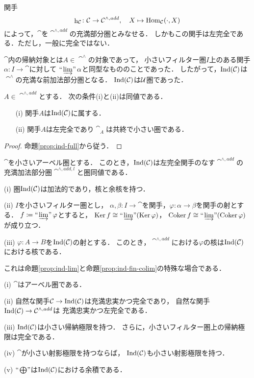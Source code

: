 関手
\begin{equation*}
    \mathop{\mathrm{h}}\nolimits_{\mathcal{C}}\colon\mathcal{C}\to\mathcal{C}^{\wedge,add},\quad X\mapsto\mathop{\mathrm{Hom}}\nolimits_{\mathcal{C}}(\cdot,X)
\end{equation*}
によって，$\cat$を$\cat^{\wedge,add}$の充満部分圏とみなせる．
しかもこの関手は左完全である．ただし，一般に完全ではない．

$\cat$内の帰納対象とは$A\in\cat^\wedge$の対象であって，
小さいフィルター圏$I$上のある関手$\alpha\colon I\to\cat$に対して
$\mathop{\text{``}\hspace{-0.7pt}\varinjlim\hspace{-1.5pt}\text{''}}\alpha$と同型なもののことであった．
したがって，$\mathop{\mathrm{Ind}}(\mathcal{C})$は$\cat^\wedge$の充満な前加法部分圏となる．
$\mathop{\mathrm{Ind}}(\mathcal{C})$は$\mathcal{U}$圏であった．

\begin{Proposition}
    $A\in\cat^{\wedge,add}$とする．
    次の条件(i)と(ii)は同値である．
    \begin{enumerate}
        \item [(i)]関手$A$は$\mathop{\mathrm{Ind}}(\mathcal{C})$に属する．
        \item [(ii)]関手$A$は左完全であり$\cat_A$は共終で小さい圏である．
    \end{enumerate}
\end{Proposition}
\begin{proof}
    命題\ref{prop:ind-full}から従う．
\end{proof}

\begin{Corollary}
    $\cat$を小さいアーベル圏とする．
    このとき，$\mathop{\mathrm{Ind}}(\mathcal{C})$は左完全関手のなす$\cat^{\wedge,add}$の
    充満加法部分圏$\cat^{\wedge,add,l}$と圏同値である．
\end{Corollary}

\begin{Lemma}\label{lem:ind-property}
    (i) 
    圏$\mathop{\mathrm{Ind}}(\mathcal{C})$は加法的であり，核と余核を持つ．

    (ii) 
    $I$を小さいフィルター圏とし，
    $\alpha, \beta\colon I\to\cat$を関手，$\varphi\colon\alpha\to\beta$を関手の射とする．
    $f\coloneqq\mathop{\text{``}\hspace{-0.7pt}\varinjlim\hspace{-1.5pt}\text{''}}\varphi$とすると，
    $\mathop{\mathrm{Ker}}\nolimits f\cong\mathop{\text{``}\hspace{-0.7pt}\varinjlim\hspace{-1.5pt}\text{''}}(\mathop{\mathrm{Ker}}\nolimits\varphi)$，
    $\mathop{\mathrm{Coker}}\nolimits f\cong\mathop{\text{``}\hspace{-0.7pt}\varinjlim\hspace{-1.5pt}\text{''}}(\mathop{\mathrm{Coker}}\nolimits\varphi)$が成り立つ．

    (iii) 
    $\varphi\colon A\to B$を$\mathop{\mathrm{Ind}}(\mathcal{C})$の射とする．
    このとき，$\cat^{\wedge,add}$における$\varphi$の核は$\mathop{\mathrm{Ind}}(\mathcal{C})$における核である．
\end{Lemma}

これは命題\ref{prop:ind-lim}と命題\ref{prop:ind-fin-colim}の特殊な場合である．

\begin{Theorem}
    (i) 
    $\cat$はアーベル圏である．

    (ii) 
    自然な関手$\mathcal{C}\to\mathop{\mathrm{Ind}}(\mathcal{C})$は充満忠実かつ完全であり，
    自然な関手$\mathop{\mathrm{Ind}}(\mathcal{C})\to\mathcal{C}^{\wedge,add}$は
    充満忠実かつ左完全である．

    (iii) 
    $\mathop{\mathrm{Ind}}(\mathcal{C})$は小さい帰納極限を持つ．
    さらに，小さいフィルター圏上の帰納極限は完全である．

    (iv) 
    $\cat$が小さい射影極限を持つならば，
    $\mathop{\mathrm{Ind}}(\mathcal{C})$も小さい射影極限を持つ．

    (v) 
    $\ind<\bigoplus>$は$\mathop{\mathrm{Ind}}(\mathcal{C})$における余積である．
\end{Theorem}

